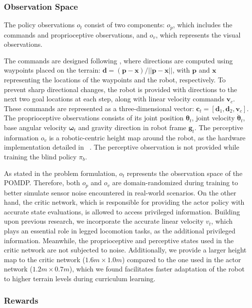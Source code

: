 \subsubsection{Observation Space}

The policy observations $o_t$ consist of two components: $o_p$, which includes the commands and proprioceptive observations, and $o_v$, which represents the visual observations.

The commands are designed following \cite{cheng2024extreme}, where directions are computed using waypoints placed on the terrain: $\textbf{d} = (\textbf{p} - \textbf{x}) / ||\textbf{p} - \textbf{x}||$, with $\textbf{p}$ and $\textbf{x}$ representing the locations of the waypoints and the robot, respectively. To prevent sharp directional changes, the robot is provided with directions to the next two goal locations at each step, along with linear velocity commands $\textbf{v}_c$. These commands are represented as a three-dimensional vector: $\textbf{c}_t = [\textbf{d}_1, \textbf{d}_2, \textbf{v}_c]$. The proprioceptive observations consists of its joint position $\mathbf{\theta}_t$, joint velocity $\dot{\mathbf{\theta}}_t$, base angular velocity $\mathbf{\omega}_t$ and gravity direction in robot frame $\mathbf{g}_t$. The perceptive information $o_v$ is a robotic-centric height map around the robot, as the hardware implementation detailed in ~\cite{long2024learning}. The perceptive observation is not provided while training the blind policy $\pi_b$.

As stated in the problem formulation, $o_t$ represents the observation space of the POMDP. Therefore, both $o_p$ and $o_v$ are domain-randomized during training to better simulate sensor noise encountered in real-world scenarios. On the other hand, the critic network, which is responsible for providing the actor policy with accurate state evaluations, is allowed to access privileged information. Building upon previous research, we incorporate the accurate linear velocity $v_t$, which plays an essential role in legged locomotion tasks, as the additional privileged information. Meanwhile, the proprioceptive and perceptive states used in the critic network are not subjected to noise. Additionally, we provide a larger height map to the critic network ($1.6m \times 1.0m$) compared to the one used in the actor network ($1.2m \times 0.7m$), which we found facilitates faster adaptation of the robot to higher terrain levels during curriculum learning.

\subsubsection{Rewards}

